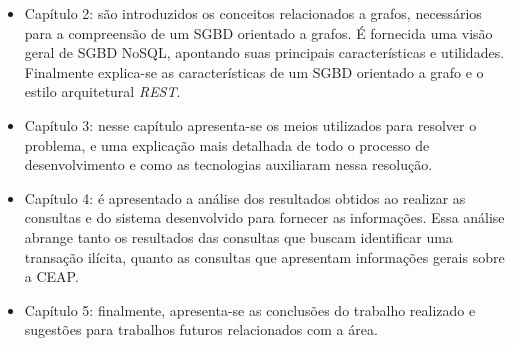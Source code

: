 	\begin{itemize}
		\item Capítulo 2: são introduzidos os conceitos relacionados a grafos, necessários para a compreensão de um SGBD orientado a grafos. É fornecida uma visão geral de SGBD NoSQL, apontando suas principais características e utilidades. Finalmente explica-se as características de um SGBD orientado a grafo e o estilo arquitetural \textit{REST}.
		\item Capítulo 3: nesse capítulo apresenta-se os meios utilizados para resolver o problema, e uma explicação mais detalhada de todo o processo de desenvolvimento e como as tecnologias auxiliaram nessa resolução.
		\item Capítulo 4: é apresentado a análise dos resultados obtidos ao realizar as consultas e do sistema desenvolvido para fornecer as informações. Essa análise abrange tanto os resultados das consultas que buscam identificar uma transação ilícita, quanto as consultas que apresentam informações gerais sobre a CEAP.
		\item Capítulo 5: finalmente, apresenta-se as conclusões do trabalho realizado e sugestões para trabalhos futuros relacionados com a área.
	\end{itemize}